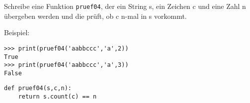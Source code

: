 \question[2] Schreibe eine Funktion \texttt{pruef04}, der ein String s, ein Zeichen
c und eine Zahl n übergeben werden und die prüft, ob c n-mal in s vorkommt.

Beispiel:
\begin{lstlisting}
>>> print(pruef04('aabbccc','a',2))
True
>>> print(pruef04('aabbccc','a',3))
False

\end{lstlisting}
\begin{solutionbox}{4cm}
\begin{lstlisting}
def pruef04(s,c,n):
    return s.count(c) == n
\end{lstlisting}
\end{solutionbox}
